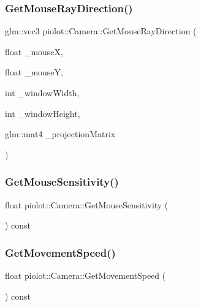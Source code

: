 \subsubsection{\texorpdfstring{Get\+Mouse\+Ray\+Direction()}{GetMouseRayDirection()}}
{\footnotesize\ttfamily glm\+::vec3 piolot\+::\+Camera\+::\+Get\+Mouse\+Ray\+Direction (\begin{DoxyParamCaption}\item[{float}]{\+\_\+mouseX,  }\item[{float}]{\+\_\+mouseY,  }\item[{int}]{\+\_\+window\+Width,  }\item[{int}]{\+\_\+window\+Height,  }\item[{glm\+::mat4}]{\+\_\+projection\+Matrix }\end{DoxyParamCaption})}

\mbox{\label{classpiolot_1_1_camera_a4f9b65c8df717b82c3b7193457ce71f0}} 
\subsubsection{\texorpdfstring{Get\+Mouse\+Sensitivity()}{GetMouseSensitivity()}}
{\footnotesize\ttfamily float piolot\+::\+Camera\+::\+Get\+Mouse\+Sensitivity (\begin{DoxyParamCaption}{ }\end{DoxyParamCaption}) const\hspace{0.3cm}{\ttfamily [inline]}}

\mbox{\label{classpiolot_1_1_camera_ad270b37d787605772644f35b844992b0}} 
\subsubsection{\texorpdfstring{Get\+Movement\+Speed()}{GetMovementSpeed()}}
{\footnotesize\ttfamily float piolot\+::\+Camera\+::\+Get\+Movement\+Speed (\begin{DoxyParamCaption}{ }\end{DoxyParamCaption}) const\hspace{0.3cm}{\ttfamily [inline]}}

